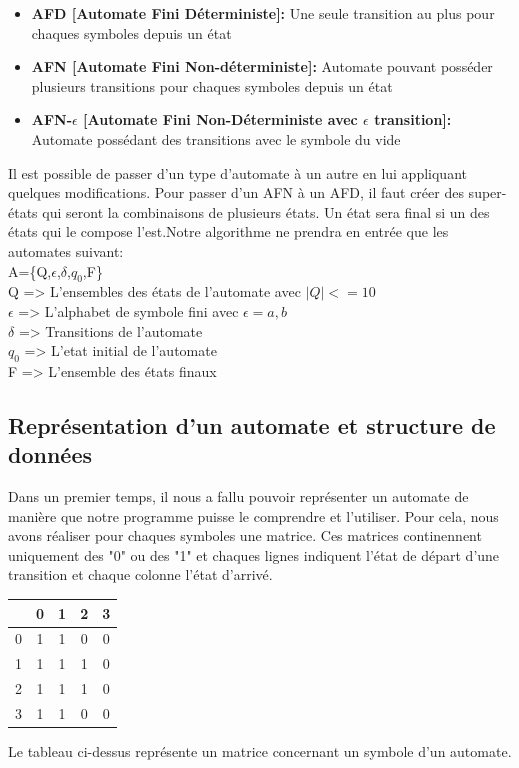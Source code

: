 \documentclass[a4paper]{article}
\begin{document}
\begin{itemize}
	\item \textbf{AFD [Automate Fini Déterministe]:} Une seule transition au plus pour 
	chaques symboles depuis un état
	\item \textbf{AFN [Automate Fini Non-déterministe]:} Automate pouvant posséder plusieurs
 transitions pour chaques symboles depuis un état
 	\item \textbf{AFN-$\epsilon$ [Automate Fini Non-Déterministe avec $\epsilon$ transition]:} Automate possédant des transitions
 	avec le symbole du vide\\
\end{itemize}

Il est possible de passer d'un type d'automate à un autre en lui appliquant quelques modifications. Pour
passer d'un AFN à un AFD, il faut créer des super-états qui seront la combinaisons de plusieurs états.
Un état sera final si un des états qui le compose l'est.Notre algorithme ne 
prendra en entrée que les automates suivant: \\

A=\{Q,$\epsilon$,$\delta$,$q_0$,F\}\\
Q => L'ensembles des états de l'automate avec $|Q|<=10$\\
$\epsilon$ => L'alphabet de symbole fini avec $\epsilon={a,b}$\\
$\delta$ => Transitions de l'automate\\
$q_0$ => L'etat initial de l'automate\\
F => L'ensemble des états finaux\\
\subsection{Représentation d'un automate et structure de données}

Dans un premier temps, il nous a fallu pouvoir représenter un automate de manière que notre
programme puisse le comprendre et l'utiliser. Pour cela, nous avons réaliser pour
chaques symboles une matrice. Ces matrices continennent uniquement des "0" ou des "1"
et chaques lignes indiquent l'état de départ d'une transition et chaque colonne l'état 
d'arrivé.\\

\begin{center}
   \begin{tabular}{| l ||*{4}{c|} }
     \hline
       & 0 & 1 & 2 & 3 \\ \hline\hline
     0 & 1 & 1 & 0 & 0 \\ \hline
     1 & 1 & 1 & 1 & 0 \\ \hline
     2 & 1 & 1 & 1 & 0 \\ \hline
     3 & 1 & 1 & 0 & 0 \\
     \hline
   \end{tabular}
 \end{center}
Le tableau ci-dessus représente un matrice concernant un symbole d'un automate.
\end{document}
